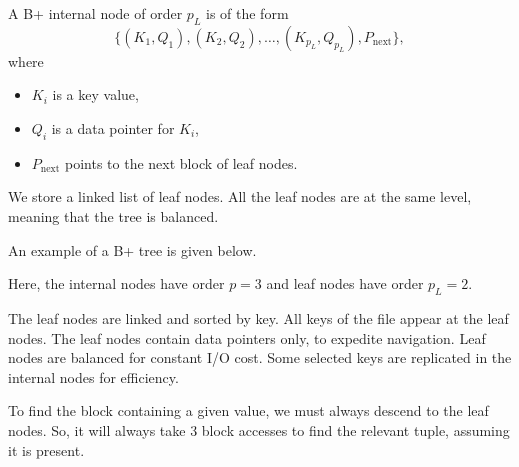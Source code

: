 \documentclass[a4paper, openany]{memoir}
\newcommand{\bnode}[3]{
    \draw (0+#1, 0+#2) -- (4.25+#1, 0+#2)
        -- (4.25+#1, 0.5+#2) 
        -- (0+#1, 0.5+#2)
        -- cycle;
    \foreach \i in {0.75, 1.75, 2.5, 3.5} {
        \draw (\i+#1, 0+#2) -- (\i+#1, 0.5+#2);
    }
    \foreach \i in {0, 1.75, 3.5} {
        \draw[fill=black] (\i+0.75/2+#1, 0.25+#2) circle (2pt);
    }
    \foreach \i in {0.75, 2.5} {
        \filldraw[red] (\i+0.75+#1, 0.25+#2) circle (2pt);
    }
    \foreach \x[count=\i] in {#3} {
        \node at (1.75*\i+#1-0.675, 0.25+#2) {\texttt{\x}};
    }
}
\newcommand{\bplusinternalnodesng}[3]{
    \draw (0+#1, 0+#2) -- (5*0.75+#1, 0+#2)
    -- (5*0.75+#1, 0.5+#2) 
    -- (0+#1, 0.5+#2)
    -- cycle;
    \foreach \i in {1, 2, 3, 4} {
        \draw (\i*0.75+#1, 0+#2) -- (\i*0.75+#1, 0.5+#2);
    }
    \foreach \i in {0, 2} {
        \draw[fill=black] (\i*0.75+0.75/2+#1, 0.25+#2) circle (2pt);
    }
    \foreach \x[count=\i] in {#3} {
        \node at (\i*0.75*2-0.75+0.75/2+#1, 0.25+#2) {\texttt{\x}};
    }
}
\newcommand{\bplusinternalnodedbl}[3]{
    \draw (0+#1, 0+#2) -- (5*0.75+#1, 0+#2)
    -- (5*0.75+#1, 0.5+#2) 
    -- (0+#1, 0.5+#2)
    -- cycle;
    \foreach \i in {1, 2, 3, 4} {
        \draw (\i*0.75+#1, 0+#2) -- (\i*0.75+#1, 0.5+#2);
    }
    \foreach \i in {0, 2, 4} {
        \draw[fill=black] (\i*0.75+0.75/2+#1, 0.25+#2) circle (2pt);
    }
    \foreach \x[count=\i] in {#3} {
        \node at (\i*0.75*2-0.75+0.75/2+#1, 0.25+#2) {\texttt{\x}};
    }
}
\newcommand{\bplusleafnodedbl}[3]{
    \draw (0+#1, 0+#2) -- (2+#1, 0+#2)
    -- (2+#1, 0.5+#2)
    -- (0+#1, 0.5+#2)
    -- cycle;

    \draw (1+#1, 0+#2) -- (1+#1, 0.5+#2);

    \foreach \x[count=\i] in {#3} {
        \filldraw[red] (\i-0.25+#1, 0.25+#2) circle (2pt);
        \node at (\i-0.75+#1, 0.25+#2) {\texttt{\x}};
    }
}
\newcommand{\bplusleafnodesng}[3]{
    \draw (0+#1, 0+#2) -- (1+#1, 0+#2)
    -- (1+#1, 0.5+#2)
    -- (0+#1, 0.5+#2)
    -- cycle;

    \filldraw[red] (0.75+#1, 0.25+#2) circle (2pt);
    \node at (0.25+#1, 0.25+#2) {\texttt{#3}};
}
\begin{document}
A B+ internal node of order $p_L$ is of the form
\[\{(K_1, Q_1), (K_2, Q_2), \dots, (K_{p_L}, Q_{p_L}), P_{\text{next}}\},\]
where
\begin{itemize}
    \item $K_i$ is a key value,
    \item $Q_i$ is a data pointer for $K_i$,
    \item $P_{\text{next}}$ points to the next block of leaf nodes.
\end{itemize}
We store a linked list of leaf nodes. All the leaf nodes are at the same level, meaning that the tree is balanced. 

An example of a B+ tree is given below.
\begin{figure}[H]
    \centering
\end{figure}
\noindent Here, the internal nodes have order $p = 3$ and leaf nodes have order $p_L = 2$. 

The leaf nodes are linked and sorted by key. All keys of the file appear at the leaf nodes. The leaf nodes contain data pointers only, to expedite navigation. Leaf nodes are balanced for constant I/O cost. Some selected keys are replicated in the internal nodes for efficiency.

To find the block containing a given value, we must always descend to the leaf nodes. So, it will always take 3 block accesses to find the relevant tuple, assuming it is present.

        
\end{document}
